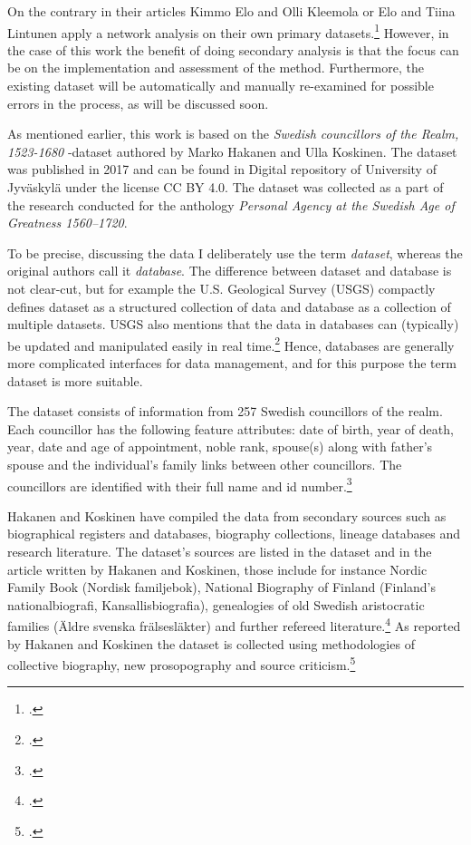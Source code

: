 On the contrary in their articles Kimmo Elo and Olli Kleemola or Elo and Tiina Lintunen apply a network analysis on their own primary datasets.\footcites{eloAklee15}{LintunenAndElo2019} However, in the case of this work the benefit of doing secondary analysis is that the focus can be on the implementation and assessment of the method. Furthermore, the existing dataset will be automatically and manually re-examined for possible errors in the process, as will be discussed soon. 

As mentioned earlier, this work is based on the \textit{Swedish councillors of the Realm, 1523-1680} -dataset authored by Marko Hakanen and Ulla Koskinen. The dataset was published in 2017 and can be found in Digital repository of University of Jyväskylä under the license CC BY 4.0. The dataset was collected as a part of the research conducted for the anthology \textit{Personal Agency at the Swedish Age of Greatness 1560–1720}.

To be precise, discussing the data I deliberately use the term \textit{dataset}, whereas the original authors call it \textit{database}. The difference between dataset and database is not clear-cut, but for example the U.S. Geological Survey (USGS) compactly defines dataset as a structured collection of data and database as a collection of multiple datasets. USGS also mentions that the data in databases can (typically) be updated and manipulated easily in real time.\footcite{usgs} Hence, databases are generally more complicated interfaces for data management, and for this purpose the term dataset is more suitable.

The dataset consists of information from 257 Swedish councillors of the realm. Each councillor has the following feature attributes: date of birth, year of death, year, date and age of appointment, noble rank, spouse(s) along with father's spouse and the individual's family links between other councillors. The councillors are identified with their full name and id number.\footcites[p. 48.]{HakanenAKoskinen2017}{councillorsDS}

Hakanen and Koskinen have compiled the data from secondary sources such as biographical registers and databases, biography collections, lineage databases and research literature. The dataset's sources are listed in the dataset and in the article written by Hakanen and Koskinen, those include for instance Nordic Family Book (Nordisk familjebok), National Biography of Finland (Finland's nationalbiografi, Kansallisbiografia), genealogies of old Swedish aristocratic families (Äldre svenska frälsesläkter) and further refereed literature.\footcites[p. 48, 76]{HakanenAKoskinen2017}{councillorsDS} As reported by Hakanen and Koskinen the dataset is collected using methodologies of collective biography, new prosopography and source criticism.\footcite[p. 48.]{HakanenAKoskinen2017}
  
